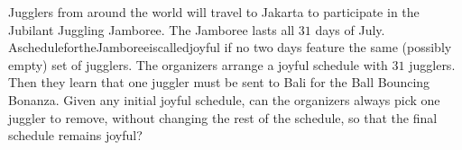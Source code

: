 Jugglers from around the world will travel to Jakarta to participate in the Jubilant Juggling Jamboree. The Jamboree lasts all $31$ days of July. AschedulefortheJamboreeiscalledjoyful if no two days feature the same (possibly empty) set of jugglers. The organizers arrange a joyful schedule with $31$ jugglers. Then they learn that one juggler must be sent to Bali for the Ball Bouncing Bonanza. Given any initial joyful schedule, can the organizers always pick one juggler to remove, without changing the rest of the schedule, so that the final schedule remains joyful?
